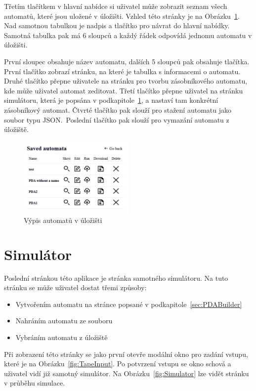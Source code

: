 Třetím tlačítkem v hlavní nabídce si uživatel může zobrazit seznam všech automatů, které jsou uložené v úložišti. Vzhled této stránky je na Obrázku~\ref{fig:Storage}. Nad samotnou tabulkou je nadpis a tlačítko pro návrat do hlavní nabídky. Samotná tabulka pak má 6 sloupců a každý řádek odpovídá jednomu automatu v úložišti.

První sloupec obsahuje název automatu, dalších 5 sloupců pak obsahuje tlačítka. První tlačítko zobrazí stránku, na které je tabulka s informacemi o automatu. Druhé tlačítko přepne uživatele na stránku pro tvorbu zásobníkového automatu, kde může uživatel automat zeditovat. Třetí tlačítko přepne uživatel na stránku simulátoru, která je popsána v podkapitole~\ref{sec:SimulatorPage}, a nastaví tam konkrétní zásobníkový automat. Čtvrté tlačítko pak slouží pro stažení automatu jako soubor typu JSON.\ Poslední tlačítko pak slouží pro vymazání automatu z úložiště.

\begin{figure}[h]
    \centering
    \includegraphics[width=0.5\textwidth]{Figures/PrntScrn_UI_Storage.png}
    \caption{Výpis automatů v úložišti}\label{fig:Storage}
\end{figure}

\section{Simulátor}\label{sec:SimulatorPage}

Poslední stránkou této aplikace je stránka samotného simulátoru. Na tuto stránku se může uživatel dostat třemi způsoby:

\begin{itemize}
    \item Vytvořením automatu na stránce popsané v podkapitole~\ref{sec:PDABuilder}
    \item Nahráním automatu ze souboru
    \item Vybráním automatu z úložiště
\end{itemize}

Při zobrazení této stránky se jako první otevře modální okno pro zadání vstupu, které je na Obrázku~\ref{fig:TapeInput}. Po potvrzení vstupu se okno schová a uživatel vidí již samotný simulátor. Na Obrázku~\ref{fig:Simulator} lze vidět stránku v průběhu simulace.

